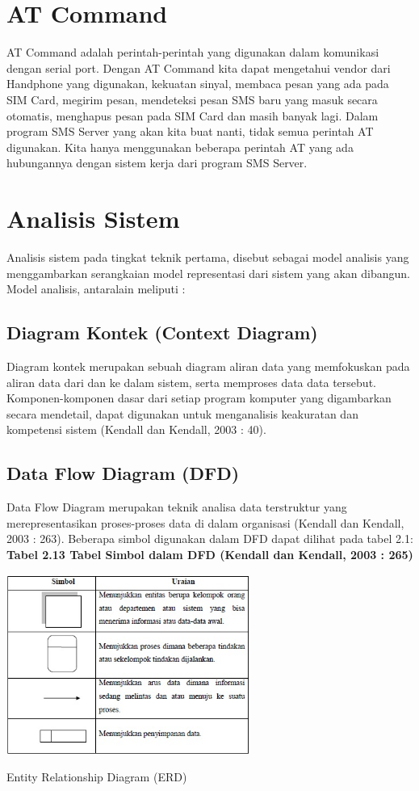 \documentclass{jtetiproposalskripsi}
\begin{document}
\section{AT Command}
AT Command adalah perintah-perintah yang digunakan dalam komunikasi dengan serial port. Dengan AT Command kita dapat mengetahui vendor dari Handphone yang digunakan, kekuatan sinyal, membaca pesan yang ada pada SIM Card, megirim pesan, mendeteksi pesan SMS baru yang masuk secara otomatis, menghapus pesan pada SIM Card dan masih banyak lagi. Dalam program SMS Server yang akan kita buat nanti, tidak semua
perintah AT digunakan. Kita hanya menggunakan beberapa perintah AT yang ada hubungannya dengan sistem kerja dari program SMS Server.

\section{Analisis Sistem}
Analisis sistem pada tingkat teknik pertama, disebut sebagai model analisis yang menggambarkan serangkaian model representasi dari sistem yang akan dibangun. Model analisis, antaralain meliputi :
\subsection{Diagram Kontek (Context Diagram)}
Diagram kontek merupakan sebuah diagram aliran data yang memfokuskan pada aliran data dari dan ke dalam sistem, serta memproses data data tersebut. Komponen-komponen dasar dari setiap program komputer yang digambarkan secara mendetail, dapat digunakan untuk menganalisis keakuratan dan kompetensi sistem (Kendall dan Kendall, 2003 : 40).

\subsection{Data Flow Diagram (DFD)}
Data Flow Diagram merupakan teknik analisa data terstruktur yang merepresentasikan proses-proses data di dalam organisasi (Kendall dan Kendall, 2003 : 263). Beberapa simbol digunakan dalam DFD dapat dilihat pada tabel 2.1:
\\
\textbf{Tabel 2.13 Tabel Simbol dalam DFD (Kendall dan Kendall, 2003 : 265)}
\begin{table}[ht!]
  \centering
    \includegraphics[width=0.6\textwidth]{gambar/1}
    \caption{Entity Relationship Diagram (ERD)}
    \label{wsn}
\end{table}
\newpage
\end{document}
